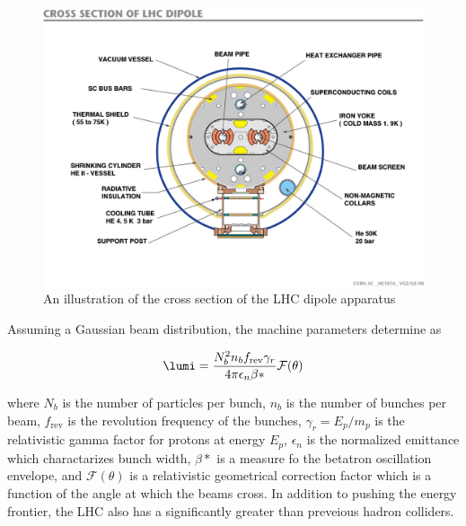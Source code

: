 \begin{figure}[htbp]
\includegraphics[width=\textwidth]{pdfs/experiment/lhc_dipole.jpg}
\caption{
 An illustration of the cross section
  of the LHC dipole apparatus 
 }
\label{fig:lhc_dipole}
\end{figure}

Assuming a Gaussian beam distribution,
 the machine parameters determine \lumi as

\begin{equation}\label{eq:lumi}
 \lumi=\frac{N_b^2 n_b f_{\mathrm{rev}} \gamma_r}{4\pi\epsilon_n \beta*}\mathcal{F}(\theta)
\end{equation}

 where $N_b$ is the number of particles per bunch,
 $n_b$ is the number of bunches per beam,
 $f_{\mathrm{rev}}$ is the revolution frequency of the bunches,
 $\gamma_r=E_p/m_p$ is the relativistic gamma factor
  for protons at energy $E_p$,
 $\epsilon_n$ is the normalized emittance which 
  charactarizes bunch width,
 $\beta*$ is a measure fo the betatron oscillation envelope,
 and $\mathcal{F}(\theta)$ is a relativistic geometrical 
 correction factor which is a function of the
 angle at which the beams cross.
In addition to pushing the energy frontier,
 the LHC also has a significantly greater
 \lumi than preveious hadron colliders. 
 

